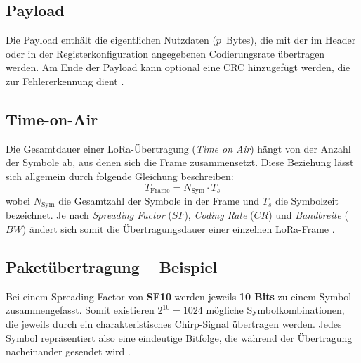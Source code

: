 \subsection{Payload}
	Die Payload enthält die eigentlichen Nutzdaten (\(p\)~Bytes), die mit der im Header oder in der Registerkonfiguration angegebenen Codierungsrate übertragen werden. Am Ende der Payload kann optional eine CRC hinzugefügt werden, die zur Fehlererkennung dient \cite{Semtech:2024}.
	
\subsection{Time-on-Air}
	Die Gesamtdauer einer LoRa-Übertragung (\textit{Time on Air}) hängt von der Anzahl der Symbole ab, 
	aus denen sich die Frame zusammensetzt. Diese Beziehung lässt sich allgemein durch folgende Gleichung beschreiben:
	\[
	T_\text{Frame} = N_\text{Sym} \cdot T_s
	\]
	wobei \(N_\text{Sym}\) die Gesamtzahl der Symbole in der Frame und \(T_s\) die Symbolzeit bezeichnet.  
	Je nach \textit{Spreading Factor} (\(SF\)), \textit{Coding Rate} (\(CR\)) und \textit{Bandbreite} (\(BW\)) 
	ändert sich somit die Übertragungsdauer einer einzelnen LoRa-Frame \cite{Montagny:2022, Semtech:2015b}.
	
\subsection{Paketübertragung – Beispiel}

Bei einem Spreading Factor von \textbf{SF10} werden jeweils \textbf{10 Bits} zu einem Symbol zusammengefasst. Somit existieren \(2^{10} = 1024\) mögliche Symbolkombinationen, die jeweils durch ein charakteristisches Chirp-Signal übertragen werden. Jedes Symbol repräsentiert also eine eindeutige Bitfolge, die während der Übertragung nacheinander gesendet wird \cite{Montagny:2022}.

